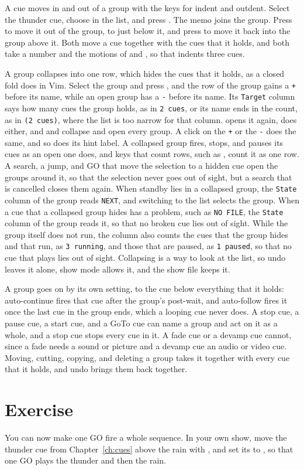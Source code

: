 A cue moves in and out of a group with the keys for indent and outdent.  Select
the thunder cue, choose  in the  list, and press
\@.  The memo joins the group.  Press \key{<<} to move it out of
the group, to just below it, and press \key{>>} to move it back into the group
above it.  Both
move a cue together with the cues that it holds, and both take a number
and the motions of  and , so that  indents three cues.

A group collapses into one row, which hides the cues that it holds, as a closed
fold does in Vim.  Select the group and press , and the row of the
group gains a \texttt{+} before its name,
while an open group has a \texttt{-} before its name.  Its \texttt{Target}
column says how many cues the group holds, as in \texttt{2 cues}, or its name
ends in the count, as in \texttt{(2 cues)}, where the list is too narrow for
that column.
 opens it again,  does either, and  and 
collapse and open every group.  A click on the \texttt{+} or the \texttt{-}
does the same, and so does its hint label.  A collapsed group fires, stops, and pauses its cues as an open
one does, and keys that count rows, such as , count it as one row.  A
search, a jump, and GO that move the selection to a hidden cue open the groups
around it, so that the selection never goes out of sight, but a search that is
cancelled closes them again.  When standby lies in a collapsed group, the
\texttt{State} column of the group reads \texttt{NEXT}\@, and switching to the
list selects the group.  When a cue that a collapsed group hides has a problem,
such as \texttt{NO FILE}, the \texttt{State} column of the group reads it, so
that no broken cue lies out of sight.  While the group itself does not run,
the column also counts the cues that the group hides and that run, as
\texttt{3 running}, and those that are paused, as \texttt{1 paused}, so that no
cue that plays lies out of sight.  Collapsing is a way to look at
the list, so undo leaves it alone, show mode allows it, and the show file keeps
it.

A group goes on by its own  setting, to the cue below everything that
it holds: auto-continue fires that cue after the group's post-wait, and
auto-follow fires it once the last cue in the group ends, which a looping
cue never does.  A stop cue, a pause cue, a start cue, and a GoTo cue can name
a group and act on it as a whole, and a stop cue stops every cue in it.  A fade
cue or a devamp cue cannot, since a fade needs a sound or picture and a devamp
cue an audio or video cue.  Moving, cutting, copying, and deleting a group takes
it together with every cue that it holds, and undo brings them back together.

\section*{Exercise}

You can now make one GO fire a whole sequence.  In your own show, move the
thunder cue from Chapter~\ref{ch:cues} above the rain with
, and set its  to , so that one GO
plays the thunder and then the rain.
